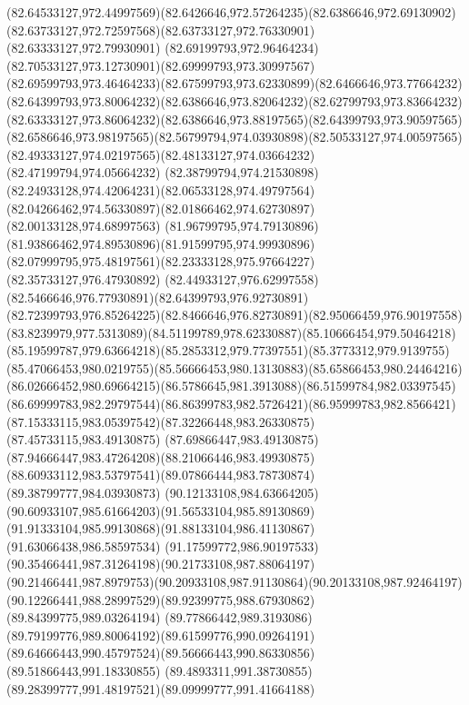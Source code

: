 {{	\curveto(82.64533127,972.44997569)(82.6426646,972.57264235)(82.6386646,972.69130902)
	\curveto(82.63733127,972.72597568)(82.63733127,972.76330901)(82.63333127,972.79930901)
	\curveto(82.69199793,972.96464234)(82.70533127,973.12730901)(82.69999793,973.30997567)
	\curveto(82.69599793,973.46464233)(82.67599793,973.62330899)(82.6466646,973.77664232)
	\curveto(82.64399793,973.80064232)(82.6386646,973.82064232)(82.62799793,973.83664232)
	\curveto(82.63333127,973.86064232)(82.6386646,973.88197565)(82.64399793,973.90597565)
	\curveto(82.6586646,973.98197565)(82.56799794,974.03930898)(82.50533127,974.00597565)
	\curveto(82.49333127,974.02197565)(82.48133127,974.03664232)(82.47199794,974.05664232)
	\curveto(82.38799794,974.21530898)(82.24933128,974.42064231)(82.06533128,974.49797564)
	\curveto(82.04266462,974.56330897)(82.01866462,974.62730897)(82.00133128,974.68997563)
	\curveto(81.96799795,974.79130896)(81.93866462,974.89530896)(81.91599795,974.99930896)
	\curveto(82.07999795,975.48197561)(82.23333128,975.97664227)(82.35733127,976.47930892)
	\curveto(82.44933127,976.62997558)(82.5466646,976.77930891)(82.64399793,976.92730891)
	\curveto(82.72399793,976.85264225)(82.8466646,976.82730891)(82.95066459,976.90197558)
	\curveto(83.8239979,977.5313089)(84.51199789,978.62330887)(85.10666454,979.50464218)
	\curveto(85.19599787,979.63664218)(85.2853312,979.77397551)(85.3773312,979.9139755)
	\curveto(85.47066453,980.0219755)(85.56666453,980.13130883)(85.65866453,980.24464216)
	\curveto(86.02666452,980.69664215)(86.5786645,981.3913088)(86.51599784,982.03397545)
	\curveto(86.69999783,982.29797544)(86.86399783,982.5726421)(86.95999783,982.8566421)
	\curveto(87.15333115,983.05397542)(87.32266448,983.26330875)(87.45733115,983.49130875)
	\curveto(87.69866447,983.49130875)(87.94666447,983.47264208)(88.21066446,983.49930875)
	\curveto(88.60933112,983.53797541)(89.07866444,983.78730874)(89.38799777,984.03930873)
	\curveto(90.12133108,984.63664205)(90.60933107,985.61664203)(91.56533104,985.89130869)
	\curveto(91.91333104,985.99130868)(91.88133104,986.41130867)(91.63066438,986.58597534)
	\curveto(91.17599772,986.90197533)(90.35466441,987.31264198)(90.21733108,987.88064197)
	\curveto(90.21466441,987.8979753)(90.20933108,987.91130864)(90.20133108,987.92464197)
	\curveto(90.12266441,988.28997529)(89.92399775,988.67930862)(89.84399775,989.03264194)
	\curveto(89.77866442,989.3193086)(89.79199776,989.80064192)(89.61599776,990.09264191)
	\curveto(89.64666443,990.45797524)(89.56666443,990.86330856)(89.51866443,991.18330855)
	\curveto(89.4893311,991.38730855)(89.28399777,991.48197521)(89.09999777,991.41664188)
}}
